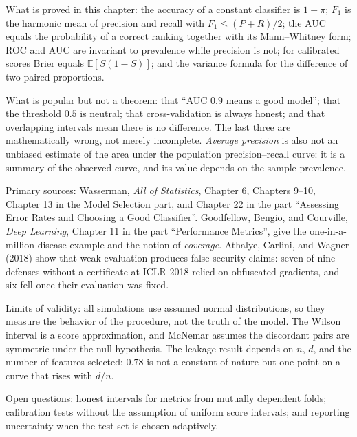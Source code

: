 \begin{untukpeneliti}
What is proved in this chapter: the accuracy of a constant classifier is $1-\pi$; $F_1$ is the
harmonic mean of precision and recall with $F_1\le(P+R)/2$; the AUC equals the probability of a
correct ranking together with its Mann--Whitney form; ROC and AUC are invariant to prevalence while
precision is not; for calibrated scores Brier equals $\mathbb{E}[S(1-S)]$; and the variance formula
for the difference of two paired proportions.

What is popular but not a theorem: that ``AUC $0.9$ means a good model''; that the threshold $0.5$
is neutral; that cross-validation is always honest; and that overlapping intervals mean there is no
difference. The last three are mathematically wrong, not merely incomplete. \emph{Average
precision} is also not an unbiased estimate of the area under the population precision--recall
curve: it is a summary of the observed curve, and its value depends on the sample prevalence.

Primary sources: Wasserman, \emph{All of Statistics}, Chapter 6, Chapters 9--10, Chapter 13 in the
Model Selection part, and Chapter 22 in the part ``Assessing Error Rates and Choosing a Good
Classifier''. Goodfellow, Bengio, and Courville, \emph{Deep Learning}, Chapter 11 in the part
``Performance Metrics'', give the one-in-a-million disease example and the notion of
\emph{coverage}. Athalye, Carlini, and Wagner (2018) show that weak evaluation produces false
security claims: seven of nine defenses without a certificate at ICLR 2018 relied on obfuscated
gradients, and six fell once their evaluation was fixed.

Limits of validity: all simulations use assumed normal distributions, so they measure the behavior
of the procedure, not the truth of the model. The Wilson interval is a score approximation, and
McNemar assumes the discordant pairs are symmetric under the null hypothesis. The leakage result
depends on $n$, $d$, and the number of features selected: $0.78$ is not a constant of nature but
one point on a curve that rises with $d/n$.

Open questions: honest intervals for metrics from mutually dependent folds; calibration tests
without the assumption of uniform score intervals; and reporting uncertainty when the test set is
chosen adaptively.
\end{untukpeneliti}

